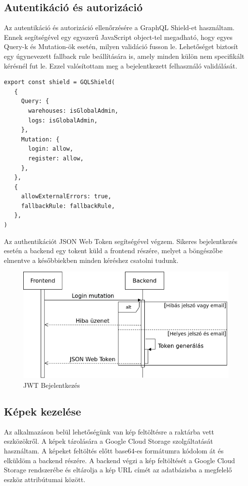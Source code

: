\subsection{Autentikáció és autorizáció}
Az autentikáció és autorizáció ellenőrzésére a GraphQL Shield-et használtam. 
Ennek segítségével egy egyszerű JavaScript object-tel megadható, hogy egyes Query-k és Mutation-ök esetén, milyen validáció fusson le.
Lehetőséget biztosít egy úgynevezett fallback rule beállítására is, amely minden külön nem specifikált kérésnél fut le.
Ezzel valósítottam meg a bejelentkezett felhasználó validálását.

\begin{lstlisting}[style=ES6, caption={GraphQL Shield}]
export const shield = GQLShield(
   {
     Query: {
       warehouses: isGlobalAdmin,
       logs: isGlobalAdmin,
     },
     Mutation: {
       login: allow,
       register: allow,
     },
   },
   {
     allowExternalErrors: true,
     fallbackRule: fallbackRule,
   },
)
\end{lstlisting}

Az authentikációt JSON Web Token segítségével végzem. 
Sikeres bejelentkezés esetén a backend egy tokent küld a frontend részére, melyet a böngészőbe elmentve a későbbiekben minden kéréshez csatolni tudunk.

\begin{figure}[!ht]
  \centering
  \includegraphics[width=150mm, keepaspectratio]{figures/login.png}
  \caption{JWT Bejelentkezés}
  \label{fig:JWT}
\end{figure}

\subsection{Képek kezelése}
Az alkalmazáson belül lehetőségünk van kép feltöltésre a raktárba vett eszközökről.
A képek tárolására a Google Cloud Storage szolgáltatását használtam. 
A képeket feltöltés előtt base64-es formátumra kódolom át és elküldöm a backend részére.
A backend végzi a kép feltöltését a Google Cloud Storage rendszerébe és eltárolja a kép URL címét az adatbázisba a megfelelő eszköz attribútumai között.

